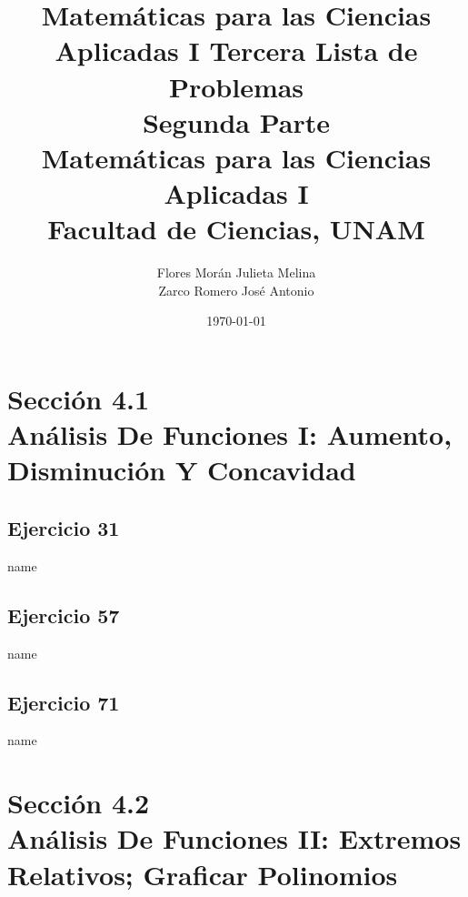 \documentclass[12pt]{article}
\title{Matemáticas para las Ciencias Aplicadas I}
\title{
	Tercera Lista de Problemas \\
	\textbf{Segunda  Parte} \\
	\vspace{1ex}
	\large Matemáticas para las Ciencias Aplicadas I \\
	Facultad de Ciencias, UNAM}
\date{\today}
\author{Flores Morán Julieta Melina \\ Zarco Romero José Antonio}
\begin{document}
\maketitle


\section{Sección 4.1 \\ Análisis De Funciones I: Aumento, Disminución Y Concavidad}
\subsection{Ejercicio 31} name \\

\subsection{Ejercicio 57} name \\

\subsection{Ejercicio 71} name \\

\section{Sección 4.2 \\ Análisis De Funciones II: Extremos Relativos; Graficar Polinomios} 
\end{document}
